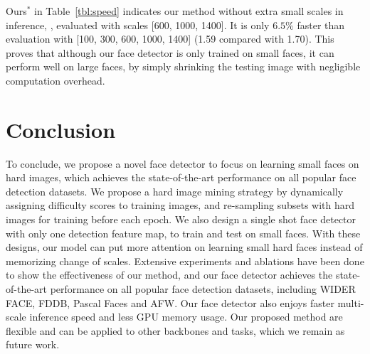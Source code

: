 \documentclass[10pt,twocolumn,letterpaper]{article}
\begin{document}
Ours$^*$ in Table~\ref{tbl:speed} indicates our method without extra small scales in
inference, \ie, evaluated with scales {[}600, 1000, 1400{]}. It is only $6.5\%$ faster
than evaluation with {[}100, 300, 600, 1000, 1400{]} (1.59 compared with 1.70). This
proves that although our face detector is only trained on small faces, it can perform
well on large faces, by simply shrinking the testing image with negligible computation
overhead.

\section{Conclusion}\label{sec:conclusion}
To conclude, we propose a novel face detector to focus on learning small faces on hard images, which
achieves the state-of-the-art performance on all popular face detection datasets. We propose a hard
image mining strategy by dynamically assigning difficulty scores to training images, and re-sampling
subsets with hard images for training before each epoch.
We also design a single shot face detector with only one detection feature map, to train and test
on small faces. With these designs, our model can put more
attention on learning small hard faces instead of memorizing change of scales.
Extensive experiments and ablations have
been done to show the effectiveness of our method, and our face detector achieves the
state-of-the-art performance on all popular face detection datasets, including WIDER FACE, FDDB, Pascal Faces and AFW. Our face detector also enjoys faster multi-scale inference
speed and less GPU memory usage.
Our proposed method are flexible and can be applied to other backbones and tasks,
which we remain as future work.

{\small


}
\end{document}
